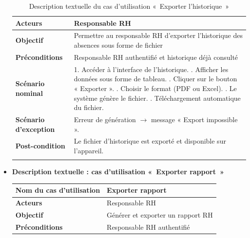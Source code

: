 \begin{itemize}
\begin{center}
\begin{longtable}{|p{5cm}|p{11cm}|}
\textbf{Acteurs} & Responsable RH \\ \hline

\textbf{Objectif} & Permettre au responsable RH d’exporter l’historique des absences sous forme de fichier \\ \hline

\textbf{Préconditions} & Responsable RH authentifié et historique déjà consulté \\ \hline

\textbf{Scénario nominal} &
1. Accéder à l’interface de l’historique. \newline
2. Afficher les données sous forme de tableau. \newline
3. Cliquer sur le bouton « Exporter ». \newline
4. Choisir le format (PDF ou Excel). \newline
5. Le système génère le fichier. \newline
6. Téléchargement automatique du fichier. \\ \hline

\textbf{Scénario d'exception} &
Erreur de génération $\rightarrow$ message « Export impossible ». \\ \hline

\textbf{Post-condition} &
Le fichier d’historique est exporté et disponible sur l’appareil. \\ \hline

\caption{Description textuelle du cas d'utilisation «~Exporter l'historique~»}
\end{longtable}
\end{center}

\item \textbf{Description textuelle : cas d'utilisation «~Exporter rapport~»}

\begin{center}
\begin{longtable}{|p{5cm}|p{11cm}|}
\hline

\textbf{Nom du cas d'utilisation} & Exporter rapport \\ \hline

\textbf{Acteurs} & Responsable RH \\ \hline

\textbf{Objectif} & Générer et exporter un rapport RH \\ \hline

\textbf{Préconditions} & Responsable RH authentifié \\ \hline


\end{longtable}
\end{center}
\end{itemize}
